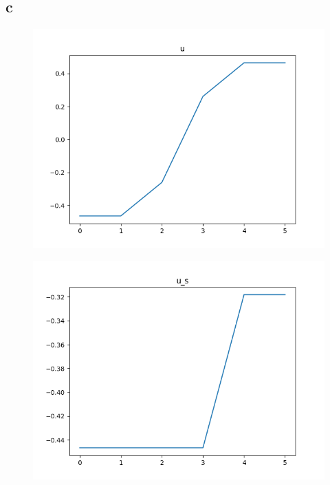 \documentclass{article}
\begin{document}
\subsection{c}
\begin{figure}[h!]
  \includegraphics[width=\linewidth]{u.png}
\end{figure}
\begin{figure}[h!]
  \includegraphics[width=\linewidth]{u_s.png}
\end{figure}

\newpage
\end{document}
